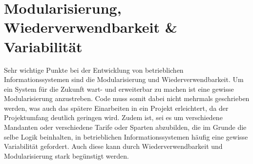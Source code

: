 \section{Modularisierung, Wiederverwendbarkeit \& Variabilität}

Sehr wichtige Punkte bei der Entwicklung von betrieblichen Informationssystemen sind die Modularisierung und Wiederverwendbarkeit. Um ein System für die Zukunft wart- und erweiterbar zu machen ist eine gewisse Modularisierung anzustreben. Code muss somit dabei nicht mehrmals geschrieben werden, was auch das spätere Einarbeiten in ein Projekt erleichtert, da der Projektumfang deutlich geringen wird. Zudem ist, sei es um verschiedene Mandanten oder verschiedene Tarife oder Sparten abzubilden, die im Grunde die selbe Logik beinhalten, in betrieblichen Informationssystemen häufig eine gewisse Variabilität gefordert. Auch diese kann durch Wiederverwendbarkeit und Modularisierung stark begünstigt werden.


